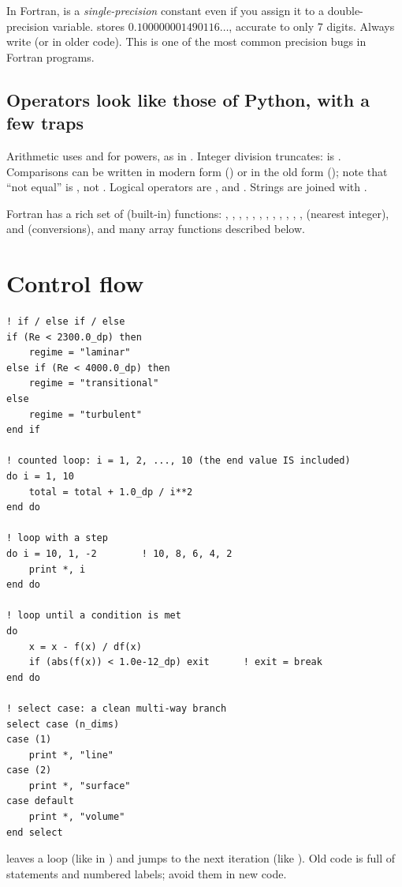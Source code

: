 \begin{pitfall}
In Fortran,  is a \emph{single-precision} constant even if you assign it to a
double-precision variable.  stores $0.100000001490116\ldots$, accurate to only
7 digits. Always write  (or  in older code). This is one of the
most common precision bugs in Fortran programs.
\end{pitfall}

\subsection*{Operators look like those of Python, with a few traps}

Arithmetic uses \code{+ - * /} and \code{**} for powers, as in \py. Integer division
truncates:  is . Comparisons can be written in modern form
(\code{== /= < <= > >=}) or in the old form (); note
that ``not equal'' is \code{/=}, not \code{!=}. Logical operators are ,
 and . Strings are joined with \code{//}.

Fortran has a rich set of  (built-in) functions: , ,
, , , , , , ,
, , ,  (nearest integer),  and
 (conversions), and many array functions described below.

\section{Control flow}

\begin{lstlisting}[language={[08]Fortran}]
! if / else if / else
if (Re < 2300.0_dp) then
    regime = "laminar"
else if (Re < 4000.0_dp) then
    regime = "transitional"
else
    regime = "turbulent"
end if

! counted loop: i = 1, 2, ..., 10 (the end value IS included)
do i = 1, 10
    total = total + 1.0_dp / i**2
end do

! loop with a step
do i = 10, 1, -2        ! 10, 8, 6, 4, 2
    print *, i
end do

! loop until a condition is met
do
    x = x - f(x) / df(x)
    if (abs(f(x)) < 1.0e-12_dp) exit      ! exit = break
end do

! select case: a clean multi-way branch
select case (n_dims)
case (1)
    print *, "line"
case (2)
    print *, "surface"
case default
    print *, "volume"
end select
\end{lstlisting}
 leaves a loop (like  in \py) and  jumps to the next
iteration (like ). Old code is full of  statements and numbered
labels; avoid them in new code.

